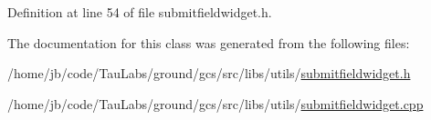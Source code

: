 \-Definition at line 54 of file submitfieldwidget.\-h.



\-The documentation for this class was generated from the following files\-:\begin{DoxyCompactItemize}
\item 
/home/jb/code/\-Tau\-Labs/ground/gcs/src/libs/utils/\hyperlink{submitfieldwidget_8h}{submitfieldwidget.\-h}\item 
/home/jb/code/\-Tau\-Labs/ground/gcs/src/libs/utils/\hyperlink{submitfieldwidget_8cpp}{submitfieldwidget.\-cpp}\end{DoxyCompactItemize}
